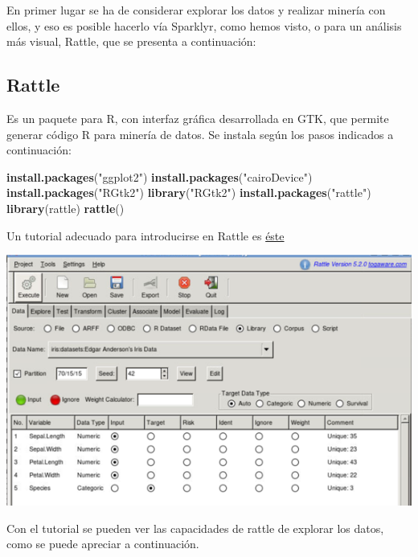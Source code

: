 \documentclass[]{book}
\newenvironment{Shaded}{\begin{snugshade}}{\end{snugshade}}
\newcommand{\KeywordTok}[1]{\textcolor[rgb]{0.13,0.29,0.53}{\textbf{#1}}}
\newcommand{\NormalTok}[1]{#1}
\newcommand{\StringTok}[1]{\textcolor[rgb]{0.31,0.60,0.02}{#1}}
\begin{document}
En primer lugar se ha de considerar explorar los datos y realizar minería con ellos, y eso es posible hacerlo vía Sparklyr, como hemos visto, o para un análisis más visual, Rattle, que se presenta a continuación:

\hypertarget{rattle}{%
\subsection{Rattle}\label{rattle}}

Es un paquete para R, con interfaz gráfica desarrollada en GTK, que permite generar código R para minería de datos. Se instala según los pasos indicados a continuación:

\begin{Shaded}
\begin{Highlighting}[]
\KeywordTok{install.packages}\NormalTok{(}\StringTok{"ggplot2"}\NormalTok{)}
\KeywordTok{install.packages}\NormalTok{(}\StringTok{"cairoDevice"}\NormalTok{)}
\KeywordTok{install.packages}\NormalTok{(}\StringTok{"RGtk2"}\NormalTok{)}
\KeywordTok{library}\NormalTok{(}\StringTok{"RGtk2"}\NormalTok{)}
\KeywordTok{install.packages}\NormalTok{(}\StringTok{"rattle"}\NormalTok{)}
\KeywordTok{library}\NormalTok{(rattle)}
\KeywordTok{rattle}\NormalTok{()}
\end{Highlighting}
\end{Shaded}

Un tutorial adecuado para introducirse en Rattle es \href{https://www.dummies.com/programming/using-rattle-iris-r-programming/}{éste}

\includegraphics{images/T3-rattle1.png}

Con el tutorial se pueden ver las capacidades de rattle de explorar los datos, como se puede apreciar a continuación.
\end{document}
